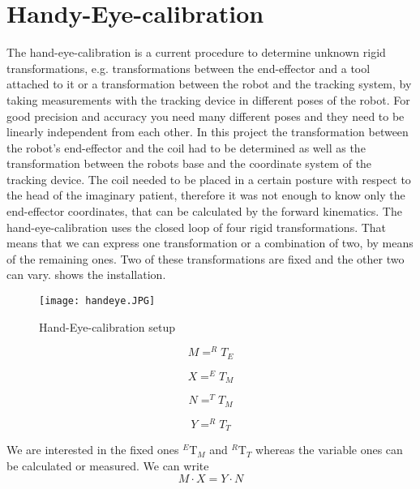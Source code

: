\section{Handy-Eye-calibration}

The hand-eye-calibration is a current procedure to determine unknown rigid transformations, e.g. transformations between the end-effector and a tool attached to it or a transformation between the robot and the tracking system,
by taking measurements with the tracking device in different poses of the robot. For good precision and accuracy you need many different poses and they need to be linearly independent from each other. 
In this project the transformation between the robot's end-effector and the coil had to be 
determined as well as the transformation between the robots base and the coordinate system of the tracking device. The coil needed to be placed in a certain posture with respect to the head of the imaginary patient, therefore it was not enough to know only the end-effector coordinates, that can be calculated by the forward kinematics. The hand-eye-calibration uses the closed loop of four rigid transformations. That means that we can express one transformation or a combination of two, by means of the remaining ones. Two of these transformations are fixed and the other two can vary.  shows the installation.

\begin{figure}[!t]
	\centering 
		\texttt{[image: handeye.JPG]}		
			\caption{Hand-Eye-calibration setup} 
			\label{handeye} 
\end{figure}

\begin{equation}
	M = ^RT_E
\end{equation}

\begin{equation}
	X = ^ET_M
\end{equation}
	
\begin{equation}
	N = ^TT_M
\end{equation}
	
\begin{equation}
	Y = ^RT_T
\end{equation}

We are interested in the fixed ones $^E$T$_M$ and $^R$T$_T$ whereas the variable ones can be calculated or measured. We can write \\

\begin{equation}
	M \cdot X = Y \cdot N
\end{equation}

